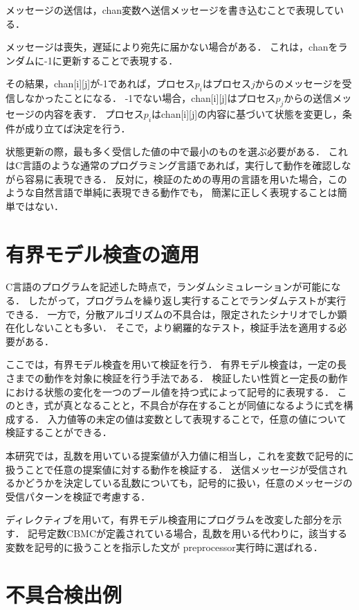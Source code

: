 \documentclass[technicalreport]{ieicej}
\theoremstyle{plain}
\begin{document}
メッセージの送信は，chan変数へ送信メッセージを書き込むことで表現している．

メッセージは喪失，遅延により宛先に届かない場合がある．
これは，chanをランダムに-1に更新することで表現する．

その結果，chan[i][j]が-1であれば，プロセス$p_i$はプロセス$j$からのメッセージを受信しなかったことになる．
-1でない場合，chan[i][j]はプロセス$p_j$からの送信メッセージの内容を表す．
プロセス$p_i$はchan[i][j]の内容に基づいて状態を変更し，条件が成り立てば決定を行う．

状態更新の際，最も多く受信した値の中で最小のものを選ぶ必要がある．
これはC言語のような通常のプログラミング言語であれば，実行して動作を確認しながら容易に表現できる．
反対に，検証のための専用の言語を用いた場合，このような自然言語で単純に表現できる動作でも，
簡潔に正しく表現することは簡単ではない．

\section{有界モデル検査の適用}\label{sec:cmbc}

C言語のプログラムを記述した時点で，ランダムシミュレーションが可能になる．
したがって，プログラムを繰り返し実行することでランダムテストが実行できる．
一方で，分散アルゴリズムの不具合は，限定されたシナリオでしか顕在化しないことも多い．
そこで，より網羅的なテスト，検証手法を適用する必要がある．

ここでは，有界モデル検査を用いて検証を行う．
有界モデル検査は，一定の長さまでの動作を対象に検証を行う手法である．
検証したい性質と一定長の動作における状態の変化を一つのブール値を持つ式によって記号的に表現する．
このとき，式が真となることと，不具合が存在することが同値になるように式を構成する．
入力値等の未定の値は変数として表現することで，任意の値について検証することができる．

本研究では，乱数を用いている提案値が入力値に相当し，これを変数で記号的に扱うことで任意の提案値に対する動作を検証する．
送信メッセージが受信されるかどうかを決定している乱数についても，記号的に扱い，任意のメッセージの受信パターンを検証で考慮する．

ディレクティブを用いて，有界モデル検査用にプログラムを改変した部分を示す．
記号定数CBMCが定義されている場合，乱数を用いる代わりに，該当する変数を記号的に扱うことを指示した文が
preprocessor実行時に選ばれる．


\section{不具合検出例}\label{sec:casestudy}
\end{document}
